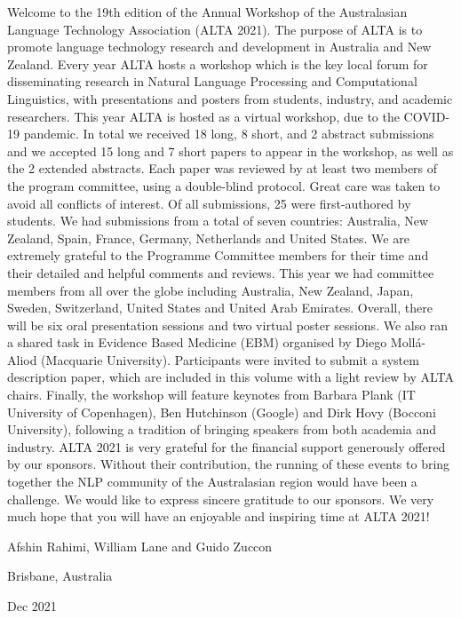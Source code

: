 \documentclass[a4paper,11pt,oneside]{book}
\begin{document}
Welcome to the 19th edition of the Annual Workshop of the Australasian Language Technology Association (ALTA 2021). The purpose of ALTA is to promote language technology research and development
in Australia and New Zealand. Every year ALTA hosts a workshop which is the key local forum for disseminating research in Natural Language Processing and Computational Linguistics, with presentations
and posters from students, industry, and academic researchers. This year ALTA is hosted as a virtual
workshop, due to the COVID-19 pandemic.
In total we received 18 long, 8 short, and 2 abstract submissions and we accepted 15 long and 7 short papers to appear
in the workshop, as well as the 2 extended abstracts. Each paper was reviewed by
at least two members of the program committee, using a double-blind protocol. Great care was taken to avoid
all conflicts of interest. Of all submissions, 25 were first-authored by students.
We had submissions from a total of seven countries: Australia, New Zealand, Spain, France, Germany, Netherlands and United
States. We are extremely grateful to the Programme Committee members for their time and their detailed and helpful comments and reviews. This year we had committee members from all over the globe
including Australia, New Zealand, Japan, Sweden, Switzerland, United States and United Arab Emirates.
Overall, there will be six oral presentation sessions and two virtual poster sessions. We also ran a shared
task in Evidence Based
Medicine (EBM) organised by Diego Mollá-Aliod (Macquarie University). Participants were invited to submit a system description paper, which are included in this volume with a light review by ALTA chairs. Finally, the workshop will feature keynotes from Barbara Plank (IT University of Copenhagen), Ben Hutchinson (Google) and
Dirk Hovy (Bocconi University), following a tradition of bringing speakers from both academia
and industry.
ALTA 2021 is very grateful for the financial support generously offered by our sponsors. Without their
contribution, the running of these events to bring together the NLP community of the Australasian region
would have been a challenge. We would like to express sincere gratitude to our sponsors.
We very much hope that you will have an enjoyable and inspiring time at ALTA 2021!

\vspace{20pt}
\hfill Afshin Rahimi, William Lane and Guido Zuccon

\hfill Brisbane, Australia 

\hfill Dec 2021
\end{document}
